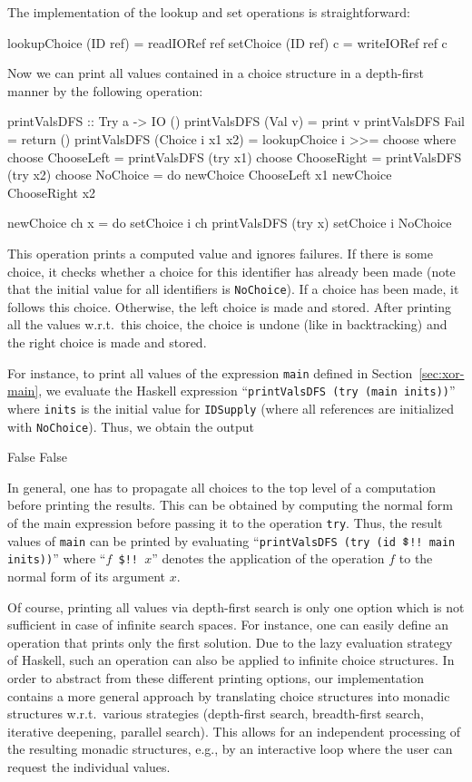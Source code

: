 \documentclass{llncs}
\newcommand{\code}[1]{\mbox{\small\texttt{#1}}}
\newcommand{\ccode}[1]{``\code{#1}''}
\newcommand{\dollar}{\code{\char36}} %
\begin{document}
The implementation of the lookup and set operations is straightforward:
\begin{haskell}
  lookupChoice (ID ref) = readIORef ref
  setChoice (ID ref) c = writeIORef ref c
\end{haskell}
Now we can print all values contained in a choice structure
in a depth-first manner by the following operation:
\label{sec:printValsDFS}
\begin{haskell}
  printValsDFS :: Try a -> IO ()
  printValsDFS (Val v)          = print v
  printValsDFS Fail             = return ()
  printValsDFS (Choice i x1 x2) = lookupChoice i >>= choose
   where
    choose ChooseLeft  = printValsDFS (try x1)
    choose ChooseRight = printValsDFS (try x2)
    choose NoChoice    = do newChoice ChooseLeft  x1
                            newChoice ChooseRight x2

    newChoice ch x = do setChoice i ch
                        printValsDFS (try x)
                        setChoice i NoChoice
\end{haskell}
This operation prints a computed value and ignores failures.
If there is some choice, it checks whether a choice for
this identifier has already been made (note that the initial value
for all identifiers is \code{NoChoice}).
If a choice has been made, it follows this choice.
Otherwise, the left choice is made and stored. After printing
all the values w.r.t.\ this choice, the choice is undone (like in backtracking)
and the right choice is made and stored.

For instance, to print all values of the expression \code{main}
defined in Section~\ref{sec:xor-main},
we evaluate the Haskell expression \ccode{printValsDFS (try (main inits))}
where \code{inits} is the initial value for \code{IDSupply}
(where all references are initialized with \code{NoChoice}).
Thus, we obtain the output
\begin{haskell}
  False
  False
\end{haskell}
In general, one has to propagate all choices to the top level
of a computation before printing the results.
This can be obtained by computing the normal form of the main
expression before passing it to the operation \code{try}.
Thus, the result values of \code{main} can be
printed by evaluating
\ccode{printValsDFS (try (id $\dollar$!! main inits))}
where \ccode{$f$ \$!! $x$} %
denotes the application of the operation $f$ to the normal form
of its argument $x$.

Of course, printing all values via depth-first search
is only one option which is not sufficient in case of infinite search
spaces. For instance, one can easily define an operation
that prints only the first solution. Due to the lazy evaluation
strategy of Haskell, such an operation can also be applied to
infinite choice structures.
In order to abstract from these different printing options,
our implementation contains a more general
approach by translating choice structures into monadic structures
w.r.t.\ various strategies (depth-first search, breadth-first search,
iterative deepening, parallel search).
This allows for an independent processing of the resulting monadic structures,
e.g.,
by an interactive loop where the user can request the individual values.
\end{document}
